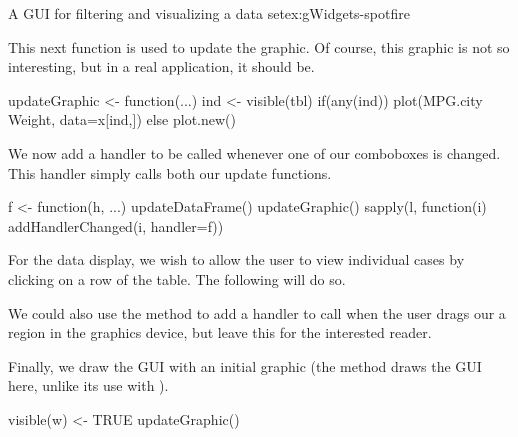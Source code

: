 \begin{example}{A GUI for filtering and visualizing a data set}{ex:gWidgets-spotfire}

This next function is used to update the graphic. Of course, this graphic is not
so interesting, but in a real application, it should be.
\begin{Schunk}
\begin{Sinput}
 updateGraphic <- function(...) {
   ind <- visible(tbl)
   if(any(ind))
     plot(MPG.city ~ Weight, data=x[ind,])
   else
     plot.new()
 }
\end{Sinput}
\end{Schunk}

We now add a handler to be called whenever one of our comboboxes is
changed. This handler simply calls both our update functions.
\begin{Schunk}
\begin{Sinput}
 f <- function(h, ...) {
   updateDataFrame()
   updateGraphic()
 }
 sapply(l, function(i) addHandlerChanged(i, handler=f))
\end{Sinput}
\end{Schunk}
%
For the data display, we wish to allow the user to view individual cases
by clicking on a row of the table. The following will do so.

\begin{Schunk}
\end{Schunk}
%
We could also use the  method to
add a handler to call when the user drags our a region in the graphics
device, but leave this for the interested reader.


Finally, we draw the GUI with an initial graphic (the
 method draws the GUI here, unlike its use
with ).
\begin{Schunk}
\begin{Sinput}
 visible(w) <- TRUE
 updateGraphic()
\end{Sinput}
\end{Schunk}
\end{example}

